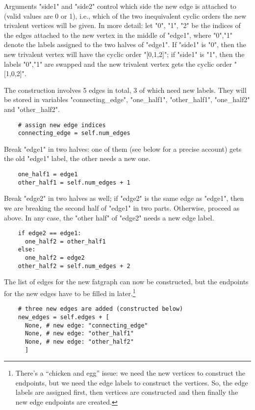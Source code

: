 Arguments "side1" and "side2" control which side the new edge is
attached to (valid values are 0 or 1), i.e., which of the two
inequivalent cyclic orders the new trivalent vertices will be given.
In more detail: let "0", "1", "2" be the indices of the edges attached
to the new vertex in the middle of "edge1", where "0","1" denote the
labels assigned to the two halves of "edge1".  If "side1" is "0", then
the new trivalent vertex will have the cyclic order "[0,1,2]"; if
"side1" is "1", then the labels "0","1" are swapped and the new
trivalent vertex gets the cyclic order "[1,0,2]".

The construction involves 5 edges in total, 3 of which need new
labels. They will be stored in variables "connecting_edge",
"one_half1", "other_half1", "one_half2" and "other_half2".
\begin{lstlisting}
    # assign new edge indices
    connecting_edge = self.num_edges
\end{lstlisting}
Break "edge1" in two halves: one of them (see below for a precise
account) gets the old "edge1" label, the other needs a new one.
\begin{lstlisting}
    one_half1 = edge1
    other_half1 = self.num_edges + 1
\end{lstlisting}
Break "edge2" in two halves as well; if "edge2" is the same edge as
"edge1", then we are breaking the second half of "edge1" in
two parts.  Otherwise, proceed as above.  In any case, the
"other half" of "edge2" needs a new edge label.
\begin{lstlisting}
    if edge2 == edge1:
      one_half2 = other_half1
    else:
      one_half2 = edge2
    other_half2 = self.num_edges + 2

\end{lstlisting}
The list of edges for the new fatgraph can now be constructed, but the
endpoints for the new edges have to be filled in
later.\footnote{There's a ``chicken and egg'' issue: we need the
  new vertices to construct the endpoints, but we need the edge labels
  to construct the vertices.  So, the edge labels are assigned first,
  then vertices are constructed and then finally the new edge
  endpoints are created.\label{fn:chicken-and-egg}}
\begin{lstlisting}
    # three new edges are added (constructed below)
    new_edges = self.edges + [
      None, # new edge: "connecting_edge"
      None, # new edge: "other_half1"
      None, # new edge: "other_half2"
      ]
\end{lstlisting}

